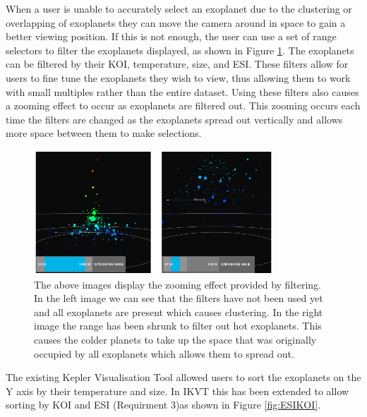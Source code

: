 When a user is unable to accurately select an
exoplanet due to the clustering or
overlapping of exoplanets they can move the camera around in space to gain a
better viewing position. If this is not
enough, the user can use a set of range selectors to filter the exoplanets
displayed, as shown in Figure \ref{fig:zoomFilter}. The exoplanets can be
filtered by their KOI,
temperature, size, and ESI. These filters allow for
users to fine tune the exoplanets they wish to view, thus allowing them to work
with small multiples rather than the entire dataset. Using
these filters also causes a zooming effect to occur as exoplanets are filtered
out.
This zooming occurs each time the filters are changed as the exoplanets spread
out vertically and allows more space between them to make selections.

\begin{figure}[H]
  \centering
      \includegraphics[width=0.8\textwidth]{images/zoomFilter.png}
  \caption[Zooming effect provided by filtering]{The above images display the
zooming effect provided by filtering. In the left image we can see that the
filters have not been used yet and all exoplanets are present which causes
clustering. In the right image the range has been  shrunk to filter out hot
exoplanets. This causes the colder planets to take up the space that was
originally occupied by all exoplanets which allows them to spread out.}  
    \label{fig:zoomFilter}
\end{figure}

The existing Kepler Visualisation Tool allowed users to sort the exoplanets on
the Y axis by their temperature and size. In IKVT this has been extended to
allow sorting by KOI and ESI (Requirment 3)as shown in Figure \ref{fig:ESIKOI}.


